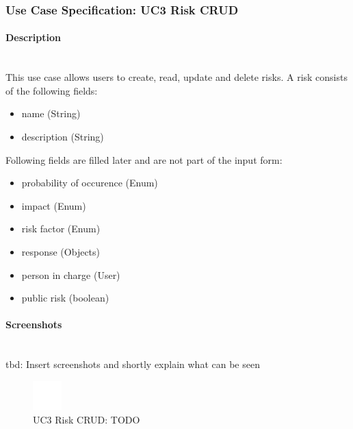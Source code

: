 \newpage
\subsubsection{Use Case Specification: \ac{UC}3 Risk CRUD}
\label{sec:domainBbd}

\paragraph*{Description}\mbox{}\\
This use case allows users to create, read, update and delete risks. 
A risk consists of the following fields:
\begin{itemize}
	\vspace{-3mm}
	\setlength\itemsep{-1em}
	\item name (String)
	\item description (String)
\end{itemize}
Following fields are filled later and are not part of the input form:
\begin{itemize}
	\vspace{-3mm}
	\setlength\itemsep{-1em}
	\item probability of occurence (Enum)
	\item impact (Enum)
	\item risk factor (Enum)
	\item response (Objects)  
	\item person in charge (User)
	\item public risk (boolean)
\end{itemize}

\paragraph*{Screenshots}\mbox{}\\
tbd: Insert screenshots and shortly explain what can be seen
\begin{figure}[h] 
	\centering
	\includegraphics[width=0.1\textwidth]{Content/Domain/placeholder.png}
	\caption{\ac{UC}3 Risk CRUD: TODO}
	\label{fig:label3}
\end{figure}

\newpage
